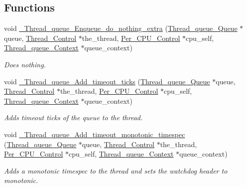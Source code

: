\subsection*{Functions}
\begin{DoxyCompactItemize}
\item 
void \mbox{\hyperlink{group__RTEMSScoreThreadQueue_ga6a087492df4bba9c56d8e8018339a84e}{\+\_\+\+Thread\+\_\+queue\+\_\+\+Enqueue\+\_\+do\+\_\+nothing\+\_\+extra}} (\mbox{\hyperlink{structThread__queue__Queue}{Thread\+\_\+queue\+\_\+\+Queue}} $\ast$queue, \mbox{\hyperlink{struct__Thread__Control}{Thread\+\_\+\+Control}} $\ast$the\+\_\+thread, \mbox{\hyperlink{structPer__CPU__Control}{Per\+\_\+\+C\+P\+U\+\_\+\+Control}} $\ast$cpu\+\_\+self, \mbox{\hyperlink{structThread__queue__Context}{Thread\+\_\+queue\+\_\+\+Context}} $\ast$queue\+\_\+context)
\begin{DoxyCompactList}\small\item\em Does nothing. \end{DoxyCompactList}\item 
void \mbox{\hyperlink{group__RTEMSScoreThreadQueue_gae6191fb5cd1e33990f9b505f12c39734}{\+\_\+\+Thread\+\_\+queue\+\_\+\+Add\+\_\+timeout\+\_\+ticks}} (\mbox{\hyperlink{structThread__queue__Queue}{Thread\+\_\+queue\+\_\+\+Queue}} $\ast$queue, \mbox{\hyperlink{struct__Thread__Control}{Thread\+\_\+\+Control}} $\ast$the\+\_\+thread, \mbox{\hyperlink{structPer__CPU__Control}{Per\+\_\+\+C\+P\+U\+\_\+\+Control}} $\ast$cpu\+\_\+self, \mbox{\hyperlink{structThread__queue__Context}{Thread\+\_\+queue\+\_\+\+Context}} $\ast$queue\+\_\+context)
\begin{DoxyCompactList}\small\item\em Adds timeout ticks of the queue to the thread. \end{DoxyCompactList}\item 
void \mbox{\hyperlink{group__RTEMSScoreThreadQueue_ga4ec75c62ea3aad333b84e577a2bb09a4}{\+\_\+\+Thread\+\_\+queue\+\_\+\+Add\+\_\+timeout\+\_\+monotonic\+\_\+timespec}} (\mbox{\hyperlink{structThread__queue__Queue}{Thread\+\_\+queue\+\_\+\+Queue}} $\ast$queue, \mbox{\hyperlink{struct__Thread__Control}{Thread\+\_\+\+Control}} $\ast$the\+\_\+thread, \mbox{\hyperlink{structPer__CPU__Control}{Per\+\_\+\+C\+P\+U\+\_\+\+Control}} $\ast$cpu\+\_\+self, \mbox{\hyperlink{structThread__queue__Context}{Thread\+\_\+queue\+\_\+\+Context}} $\ast$queue\+\_\+context)
\begin{DoxyCompactList}\small\item\em Adds a monotonic timespec to the thread and sets the watchdog header to monotonic. \end{DoxyCompactList}\item 

\end{DoxyCompactItemize}
